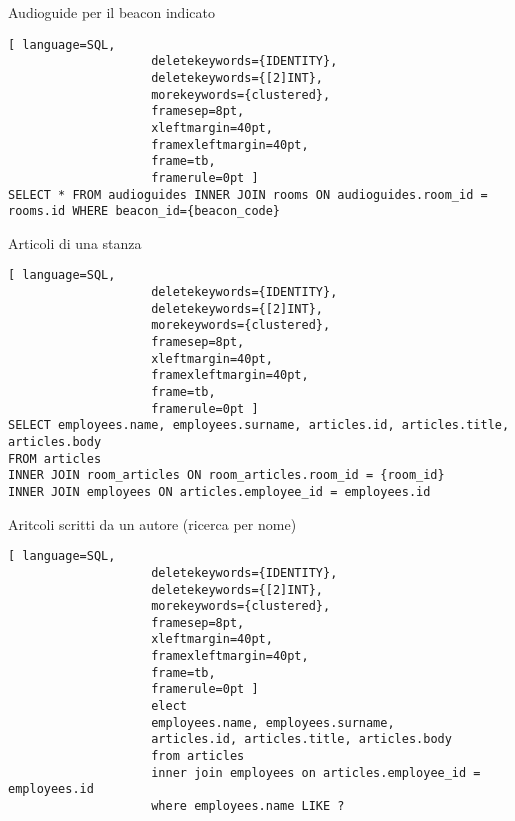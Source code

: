Audioguide per il beacon indicato
\begin{lstlisting}[ language=SQL,
                    deletekeywords={IDENTITY},
                    deletekeywords={[2]INT},
                    morekeywords={clustered},
                    framesep=8pt,
                    xleftmargin=40pt,
                    framexleftmargin=40pt,
                    frame=tb,
                    framerule=0pt ]
SELECT * FROM audioguides INNER JOIN rooms ON audioguides.room_id = rooms.id WHERE beacon_id={beacon_code}
\end{lstlisting}
Articoli di una stanza
\begin{lstlisting}[ language=SQL,
                    deletekeywords={IDENTITY},
                    deletekeywords={[2]INT},
                    morekeywords={clustered},
                    framesep=8pt,
                    xleftmargin=40pt,
                    framexleftmargin=40pt,
                    frame=tb,
                    framerule=0pt ]
SELECT employees.name, employees.surname, articles.id, articles.title, articles.body
FROM articles
INNER JOIN room_articles ON room_articles.room_id = {room_id}
INNER JOIN employees ON articles.employee_id = employees.id
\end{lstlisting}
Aritcoli scritti da un autore (ricerca per nome)
\begin{lstlisting}[ language=SQL,
                    deletekeywords={IDENTITY},
                    deletekeywords={[2]INT},
                    morekeywords={clustered},
                    framesep=8pt,
                    xleftmargin=40pt,
                    framexleftmargin=40pt,
                    frame=tb,
                    framerule=0pt ]
                    elect
                    employees.name, employees.surname,
                    articles.id, articles.title, articles.body
                    from articles
                    inner join employees on articles.employee_id = employees.id
                    where employees.name LIKE ?
\end{lstlisting}